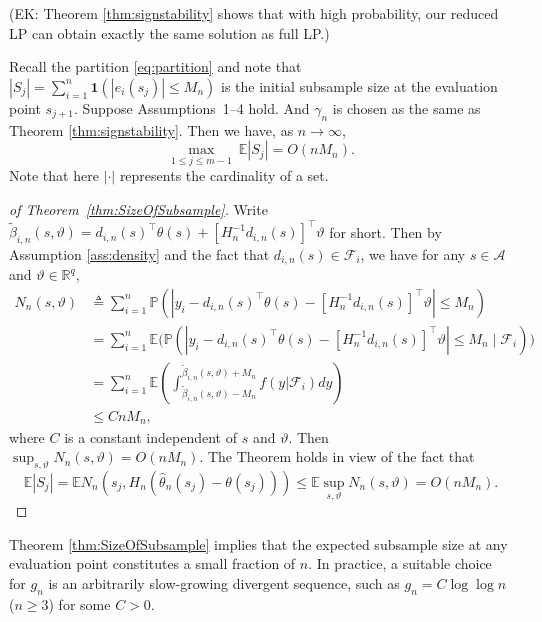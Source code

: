 \documentclass[lineno]{biometrika}
\newcommand{\ek}[1]{\textcolor{ultramarine}{(EK: #1)}}
\begin{document}
\ek{Theorem \ref{thm:signstability} shows that with high probability, our reduced LP can obtain exactly the same solution as full LP.}


\begin{theorem}\label{thm:SizeOfSubsample}
Recall the partition \eqref{eq:partition} and note that $|S_j|=\sum_{i=1}^n\mathbf{1}(|\hat e_i(s_j)|\le M_n)$ is the initial subsample size at the evaluation point $s_{j+1}$.
Suppose Assumptions~1--4 hold. And $\gamma_n$ is chosen as the same as Theorem \ref{thm:signstability}.
Then we have, as $n\to\infty$,
\[
\max_{1\le j\le m-1}\ \mathbb E|S_j| = O(nM_n).
\]
Note that here $|\cdot|$ represents the cardinality of a set.

\end{theorem}

\begin{proof}[of Theorem~\ref{thm:SizeOfSubsample}]

Write $\tilde{\beta}_{i,n}(s,\vartheta)=d_{i,n}(s)^\top\theta(s)+[H_n^{-1}d_{i,n}(s)]^\top\vartheta$ for short. Then by Assumption \ref{ass:density} and the fact that $d_{i,n}(s)\in \mathcal{F}_i$, we have for any $s\in \mathcal{A}$ and $\vartheta\in\mathbb{R}^q$,
\[
\begin{aligned}
    N_n(s,\vartheta)&\triangleq \sum_{i=1}^n\mathbb{P}(|y_i-d_{i,n}(s)^\top\theta(s)-[H_n^{-1}d_{i,n}(s)]^\top\vartheta|\le M_n)\\
    &=\sum_{i=1}^n\mathbb{E(}\mathbb{P}(|y_i-d_{i,n}(s)^\top\theta(s)-[H_n^{-1}d_{i,n}(s)]^\top\vartheta|\le M_n\mid \mathcal{F}_{i}))\\\
    &=\sum_{i=1}^n\mathbb{E}(\int_{\tilde{\beta}_{i,n}(s,\vartheta)-M_n}^{\tilde{\beta}_{i,n}(s,\vartheta)+M_n}f(y|\mathcal F_i)dy)\\
    &\le C nM_n,
\end{aligned}
\]
where $C$ is a constant independent of $s$ and $\vartheta$. Then $\sup_{s,\vartheta}N_n(s,\vartheta)=O(nM_n)$. The Theorem holds in view of the fact that 
\[
\mathbb{E}|S_j|=\mathbb{E}N_n(s_j,H_n(\hat \theta_n(s_j)-\theta(s_j)))\le \mathbb{E}\sup_{s,\vartheta}N_n(s,\vartheta)=O(nM_n).
\]



\end{proof}

\begin{remark}
    Theorem \ref{thm:SizeOfSubsample} implies that the expected subsample size at any evaluation point constitutes a small fraction of $n$. In practice, a suitable choice for $g_n$ is an arbitrarily slow-growing divergent sequence, such as $g_n = C \log \log n$ ($n\ge3$) for some $C > 0$.
\end{remark}
\end{document}
